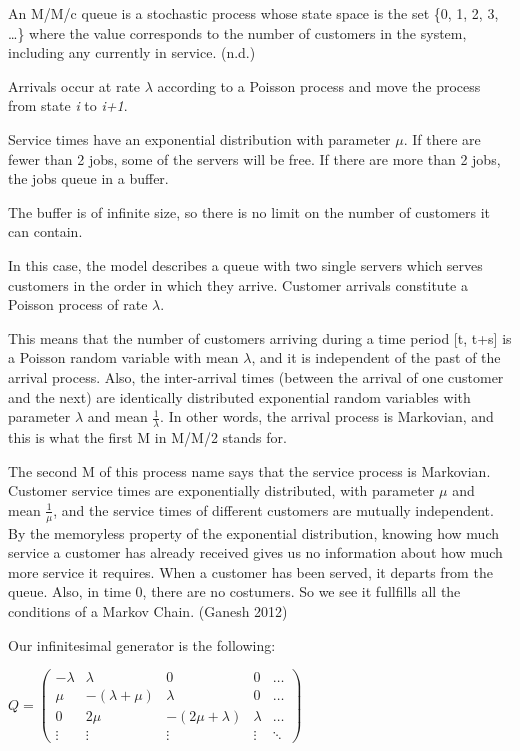 \documentclass[]{article}
\begin{document}
An M/M/c queue is a stochastic process whose state space is the set \{0,
1, 2, 3, \ldots{}\} where the value corresponds to the number of
customers in the system, including any currently in service. (n.d.)

Arrivals occur at rate \(\lambda\) according to a Poisson process and
move the process from state \emph{i} to \emph{i+1}.

Service times have an exponential distribution with parameter \(\mu\).
If there are fewer than 2 jobs, some of the servers will be free. If
there are more than 2 jobs, the jobs queue in a buffer.

The buffer is of infinite size, so there is no limit on the number of
customers it can contain.

In this case, the model describes a queue with two single servers which
serves customers in the order in which they arrive. Customer arrivals
constitute a Poisson process of rate \(\lambda\).

This means that the number of customers arriving during a time period
{[}t, t+s{]} is a Poisson random variable with mean \(\lambda\), and it
is independent of the past of the arrival process. Also, the
inter-arrival times (between the arrival of one customer and the next)
are identically distributed exponential random variables with parameter
\(\lambda\) and mean \(\frac{1}{\lambda}\). In other words, the arrival
process is Markovian, and this is what the first M in M/M/2 stands for.

The second M of this process name says that the service process is
Markovian. Customer service times are exponentially distributed, with
parameter \(\mu\) and mean \(\frac{1}{\mu}\), and the service times of
different customers are mutually independent. By the memoryless property
of the exponential distribution, knowing how much service a customer has
already received gives us no information about how much more service it
requires. When a customer has been served, it departs from the queue.
Also, in time 0, there are no costumers. So we see it fullfills all the
conditions of a Markov Chain. (Ganesh 2012)

Our infinitesimal generator is the following:

\(Q = \begin{pmatrix} - \lambda & \lambda & 0 & 0 & \dots \\ \mu & - (\lambda + \mu) & \lambda & 0 & \dots \\ 0 & 2 \mu & - (2 \mu + \lambda) & \lambda & \dots \\ \vdots & \vdots & \vdots & \vdots & \ddots \end{pmatrix}\)
\end{document}
